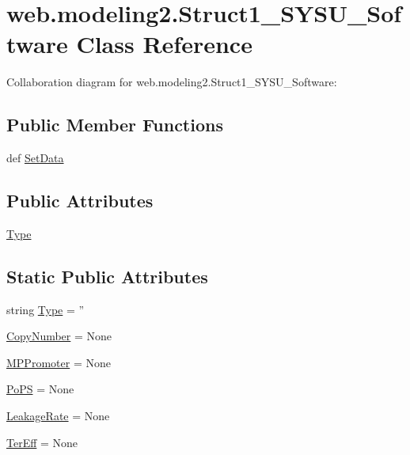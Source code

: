 \hypertarget{classweb_1_1modeling2_1_1_struct1___s_y_s_u___software}{\section{web.\-modeling2.\-Struct1\-\_\-\-S\-Y\-S\-U\-\_\-\-Software Class Reference}
\label{classweb_1_1modeling2_1_1_struct1___s_y_s_u___software}
}


Collaboration diagram for web.\-modeling2.\-Struct1\-\_\-\-S\-Y\-S\-U\-\_\-\-Software\-:
\subsection*{Public Member Functions}
\begin{DoxyCompactItemize}
\item 
def \hyperlink{classweb_1_1modeling2_1_1_struct1___s_y_s_u___software_ad73c4d66769931536fac69216ec80cb7}{Set\-Data}
\end{DoxyCompactItemize}
\subsection*{Public Attributes}
\begin{DoxyCompactItemize}
\item 
\hyperlink{classweb_1_1modeling2_1_1_struct1___s_y_s_u___software_a46261ffd06b8aad29514e2080dd98af3}{Type}
\end{DoxyCompactItemize}
\subsection*{Static Public Attributes}
\begin{DoxyCompactItemize}
\item 
string \hyperlink{classweb_1_1modeling2_1_1_struct1___s_y_s_u___software_a643acda63b29b5ed546a59e374a32065}{Type} = ''
\item 
\hyperlink{classweb_1_1modeling2_1_1_struct1___s_y_s_u___software_a81368e00274e99774546312f7aaa0571}{Copy\-Number} = None
\item 
\hyperlink{classweb_1_1modeling2_1_1_struct1___s_y_s_u___software_a1927cf67abf9b144099d98c96f698454}{M\-P\-Promoter} = None
\item 
\hyperlink{classweb_1_1modeling2_1_1_struct1___s_y_s_u___software_a7479145ae80d7882e3c5774cfcc2a11d}{Po\-P\-S} = None
\item 
\hyperlink{classweb_1_1modeling2_1_1_struct1___s_y_s_u___software_a0ce92919deee9513fd0818f7fc1d6c03}{Leakage\-Rate} = None
\item 
\hyperlink{classweb_1_1modeling2_1_1_struct1___s_y_s_u___software_aecfcb5540c96bf298317d5b06bbd775c}{Ter\-Eff} = None
\end{DoxyCompactItemize}


